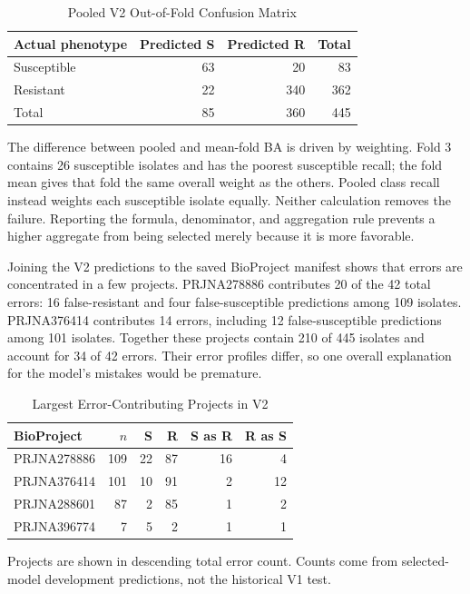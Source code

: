 \documentclass[conference]{IEEEtran}
\begin{document}
\begin{table}[t]
\caption{Pooled V2 Out-of-Fold Confusion Matrix}
\label{tab:confusion}
\centering\small
\begin{tabular}{lrrr}\toprule
Actual phenotype & Predicted S & Predicted R & Total\\\midrule
Susceptible &63&20&83\\
Resistant &22&340&362\\\midrule
Total &85&360&445\\\bottomrule
\end{tabular}
\end{table}

The difference between pooled and mean-fold BA is driven by weighting. Fold 3 contains 26 susceptible isolates and has the poorest susceptible recall; the fold mean gives that fold the same overall weight as the others. Pooled class recall instead weights each susceptible isolate equally. Neither calculation removes the failure. Reporting the formula, denominator, and aggregation rule prevents a higher aggregate from being selected merely because it is more favorable.

Joining the V2 predictions to the saved BioProject manifest shows that errors are concentrated in a few projects. PRJNA278886 contributes 20 of the 42 total errors: 16 false-resistant and four false-susceptible predictions among 109 isolates. PRJNA376414 contributes 14 errors, including 12 false-susceptible predictions among 101 isolates. Together these projects contain 210 of 445 isolates and account for 34 of 42 errors. Their error profiles differ, so one overall explanation for the model's mistakes would be premature.

\begin{table}[t]
\caption{Largest Error-Contributing Projects in V2}
\label{tab:projects}
\centering\footnotesize
\begin{tabular}{lrrrrr}\toprule
BioProject & $n$ & S & R & S as R & R as S\\\midrule
PRJNA278886&109&22&87&16&4\\
PRJNA376414&101&10&91&2&12\\
PRJNA288601&87&2&85&1&2\\
PRJNA396774&7&5&2&1&1\\\bottomrule
\end{tabular}
\vspace{3pt}
\parbox{\columnwidth}{\footnotesize Projects are shown in descending total error count. Counts come from selected-model development predictions, not the historical V1 test.}
\end{table}
\end{document}

